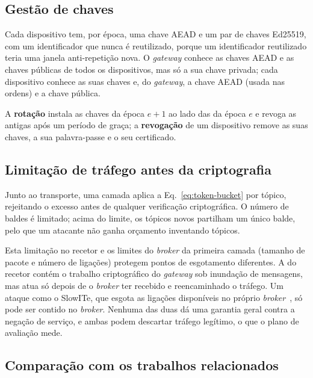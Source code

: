 \subsection{Gestão de chaves}

Cada dispositivo tem, por época, uma chave AEAD e um par de chaves Ed25519, com um
identificador que nunca é reutilizado, porque um identificador reutilizado teria uma
janela anti-repetição nova. O \emph{gateway} conhece as chaves AEAD e as chaves
públicas de todos os dispositivos, mas só a sua chave privada; cada dispositivo
conhece as suas chaves e, do \emph{gateway}, a chave AEAD (usada nas ordens) e a
chave pública.

A \textbf{rotação} instala as chaves da época $e+1$ ao lado das da época $e$ e
revoga as antigas após um período de graça; a \textbf{revogação} de um dispositivo
remove as suas chaves, a sua palavra-passe e o seu certificado.

\subsection{Limitação de tráfego antes da criptografia}

Junto ao transporte, uma camada aplica a Eq.~\eqref{eq:token-bucket} por tópico,
rejeitando o excesso antes de qualquer verificação criptográfica. O número de baldes
é limitado; acima do limite, os tópicos novos partilham um único balde, pelo que um
atacante não ganha orçamento inventando tópicos.

Esta limitação no recetor e os limites do \emph{broker} da primeira camada
(tamanho de pacote e número de ligações) protegem pontos de esgotamento
diferentes. A do recetor contém o trabalho criptográfico do \emph{gateway} sob
inundação de mensagens, mas atua só depois de o \emph{broker} ter recebido e
reencaminhado o tráfego. Um ataque como o SlowITe, que esgota as ligações
disponíveis no próprio \emph{broker}~\cite{vaccari2020slowite}, só pode ser contido
no \emph{broker}. Nenhuma das duas dá uma garantia geral contra a negação de
serviço, e ambas podem descartar tráfego legítimo, o que o plano de avaliação
mede.

\subsection{Comparação com os trabalhos relacionados}
\label{sec:comparacao-proposta}

